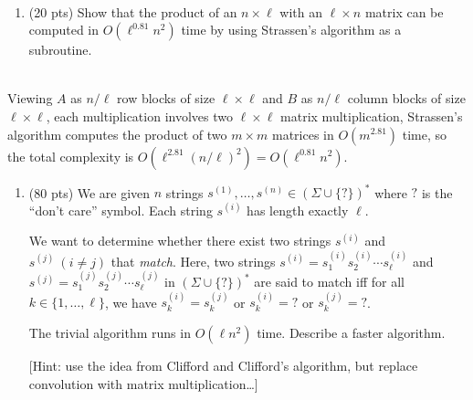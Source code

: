 \documentclass[11pt]{article}
\begin{document}
\begin{description}
\begin{enumerate}
\end{enumerate}


\newpage
\item[Problem 1.3:]\

\begin{enumerate}
\item[(a)] (20 pts)
Show that  the product of an $n\times\ell$ with an $\ell\times n$ matrix can be computed
in $O(\ell^{0.81} n^2)$ time by using Strassen's algorithm as a subroutine.
\end{enumerate}

\medskip
{}\\
Viewing $A$ as $n/\ell$ row blocks of size $\ell \times \ell$ and $B$ as $n/\ell$ column blocks of size $\ell \times \ell$, each multiplication involves two $\ell \times \ell$ matrix multiplication, Strassen's algorithm computes the product of two $m \times m$ matrices in $O(m^{2.81})$ time, so the total complexity is $O(\ell^{2.81} (n/\ell)^2) = O(\ell^{0.81} n^2)$.



\medskip
\begin{enumerate}
\item[(b)] (80 pts)
\newcommand{\DC}{\texttt{?}}
We are given $n$ strings $s^{(1)},\ldots,s^{(n)}\in
(\Sigma\cup\{\DC\})^*$  where $\DC$ is the ``don't care'' symbol.  
Each string $s^{(i)}$ has length exactly $\ell$.

We want to determine whether there exist two strings $s^{(i)}$ and
$s^{(j)}\ (i\neq j)$ that \emph{match}.  Here,
two strings $s^{(i)}=s_1^{(i)}s_2^{(i)}\cdots s_\ell^{(i)}$ and $s^{(j)}=s_1^{(j)}s_2^{(j)}\cdots s_\ell^{(j)}$ in $(\Sigma\cup\{\DC\})^*$ are said to match iff for all $k\in\{1,\ldots,\ell\}$,
we have $s_k^{(i)}=s_k^{(j)}$ or $s_k^{(i)}=\DC$ or $s_k^{(j)}=\DC$.

The trivial algorithm runs in $O(\ell n^2)$ time.
Describe a faster algorithm.

[Hint: use the idea from Clifford and Clifford's algorithm, but replace convolution with matrix multiplication\ldots] 
\end{enumerate}


\end{description}
\end{document}
